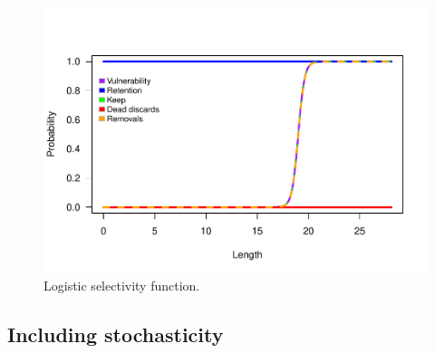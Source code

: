 \documentclass[
]{book}
\begin{document}
\begin{figure}
\centering
\includegraphics{_main_files/figure-latex/selgrouper-1.pdf}
\caption{\label{fig:selgrouper}Logistic selectivity function.}
\end{figure}

\subsection{Including stochasticity}\label{including-stochasticity}
\end{document}

